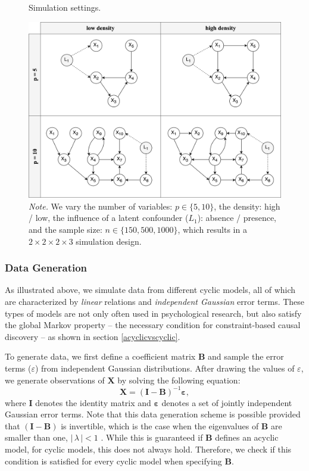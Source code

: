 \documentclass[twoside, 11pt]{article}
\begin{document}
\begin{figure}[t]
    \centering
        \caption{Simulation settings.}
        \vspace{1mm}
        \includegraphics[width=1\textwidth]{figures/simsetting3.png}
        \vspace*{-2mm}
        \caption*{\small{\textit{Note.} We vary the number of variables: $p \in \{5, 10\}$, the density: high / low, the influence of a latent confounder ($L_1$): absence / presence, and the sample size: $n \in \{150, 500, 1000\}$, which results in a $2 \times 2 \times 2 \times 3$ simulation design.}}
    \label{fig:6}
\end{figure}

\pagebreak
\vspace*{-1.5cm}
\subsubsection{Data Generation}
As illustrated above, we simulate data from different cyclic models, all of which are characterized by \textit{linear} relations and \textit{independent Gaussian} error terms. These types of models are not only often used in psychological research, but also satisfy the global Markov property -- the necessary condition for constraint-based causal discovery -- as shown in section \ref{acyclicvscyclic}.

To generate data, we first define a coefficient matrix $\mathbf{B}$ and sample the error terms ($\varepsilon$) from independent Gaussian distributions. After drawing the values of $\varepsilon$, we generate observations of $\mathbf{X}$ by solving the following equation: 
$$\mathbf{X} = (\mathbf{I} - \mathbf{B})^{-1}\boldsymbol{\varepsilon},$$
where $\mathbf{I}$ denotes the identity matrix and $\boldsymbol{\varepsilon}$ denotes a set of jointly independent Gaussian error terms. Note that this data generation scheme is possible provided that $(\mathbf{I} - \mathbf{B})$ is invertible, which is the case when the eigenvalues of $\mathbf{B}$ are smaller than one, $|\,\lambda\,| < 1$ \citep{eberhardt2010}. While this is guaranteed if $\mathbf{B}$ defines an acyclic model, for cyclic models, this does not always hold. Therefore, we check if this condition is satisfied for every cyclic model when specifying $\mathbf{B}$.
\end{document}
